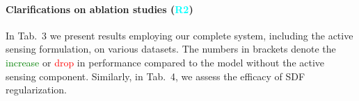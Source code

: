 \documentclass[10pt,twocolumn,letterpaper]{article}
\newcommand{\RTwo}{{\textcolor{cyan}{\textbf{R2}}}}
\begin{document}
\paragraph{Clarifications on ablation studies (\RTwo)} 
In Tab.~3 we present results employing our complete system, including the active sensing formulation, on various datasets. The numbers in brackets denote the \textcolor{green}{increase} or \textcolor{red}{drop} in performance compared to the model without the active sensing component. Similarly, in Tab.~4, we assess the efficacy of SDF regularization.
\end{document}
